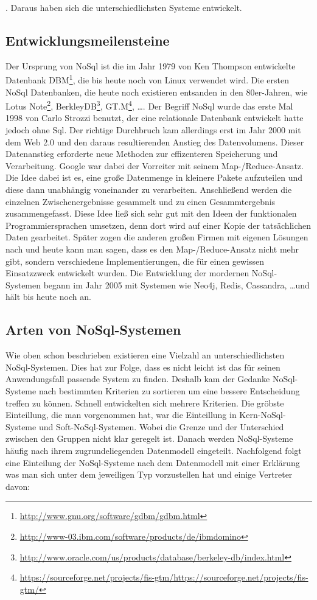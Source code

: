 . Daraus haben sich die unterschiedlichsten Systeme entwickelt.

\subsection{Entwicklungsmeilensteine}
Der Ursprung von NoSql ist die im Jahr 1979 von Ken Thompson entwickelte
Datenbank DBM\footnote{\url{http://www.gnu.org/software/gdbm/gdbm.html}}, die
bis heute noch von Linux verwendet wird. Die ersten NoSql Datenbanken, die
heute noch existieren entsanden in den 80er-Jahren, wie Lotus Note\footnote{\url{http://www-03.ibm.com/software/products/de/ibmdomino}},
BerkleyDB\footnote{\url{http://www.oracle.com/us/products/database/berkeley-db/index.html}},
GT.M\footnote{\url{https://sourceforge.net/projects/fis-gtm/https://sourceforge.net/projects/fis-gtm/}}, \ldots .
Der Begriff NoSql wurde das erste Mal 1998 von Carlo Strozzi benutzt, der eine
relationale Datenbank entwickelt hatte jedoch ohne Sql. Der richtige Durchbruch
kam allerdings erst im Jahr 2000 mit dem Web 2.0 und den daraus resultierenden
Anstieg des Datenvolumens. Dieser Datenanstieg erforderte neue Methoden zur
effizenteren Speicherung und Verarbeitung. Google war dabei der Vorreiter mit
seinem Map-/Reduce-Ansatz. Die Idee dabei ist es, eine große Datenmenge in
kleinere Pakete aufzuteilen und diese dann unabhängig voneinander zu verarbeiten.
Anschließend werden die einzelnen Zwischenergebnisse gesammelt und zu einen
Gesammtergebnis zusammengefasst. Diese Idee ließ sich sehr gut mit den Ideen
der funktionalen Programmiersprachen umsetzen, denn dort wird auf einer Kopie
der tatsächlichen Daten gearbeitet. Später zogen die anderen großen Firmen mit
eigenen Lösungen nach und heute kann man sagen, dass es den Map-/Reduce-Ansatz
nicht mehr gibt, sondern verschiedene Implementierungen, die für einen gewissen
Einsatzzweck entwickelt wurden. Die Entwicklung der mordernen NoSql-Systemen
begann im Jahr 2005 mit Systemen wie Neo4j, Redis, Cassandra, \ldots und hält
bis heute noch an.

\subsection{Arten von NoSql-Systemen}
Wie oben schon beschrieben existieren eine Vielzahl an unterschiedlichsten
NoSql-Systemen. Dies hat zur Folge, dass es nicht leicht ist das für seinen
Anwendungsfall passende System zu finden. Deshalb kam der Gedanke NoSql-Systeme
nach bestimmten Kriterien zu sortieren um eine bessere Entscheidung treffen zu
können. Schnell entwickelten sich mehrere Kriterien. Die gröbste Einteillung,
die man vorgenommen hat, war die Einteillung in Kern-NoSql-Systeme und
Soft-NoSql-Systemen. Wobei die Grenze und der Unterschied zwischen den Gruppen
nicht klar geregelt ist. Danach werden NoSql-Systeme häufig nach ihrem
zugrundeliegenden Datenmodell eingeteilt. Nachfolgend folgt eine Einteilung der
NoSql-Systeme nach dem Datenmodell mit einer Erklärung was man sich unter dem
jeweiligen Typ vorzustellen hat und einige Vertreter davon:

